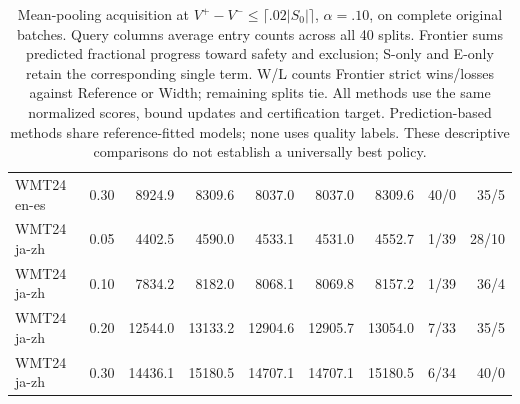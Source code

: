 \begin{table}[t]
\begin{tabular}{lrrrrrrrr}
WMT24 en-es & 0.30 & 8924.9 & 8309.6 & 8037.0 & 8037.0 & 8309.6 & 40/0 & 35/5 \\
WMT24 ja-zh & 0.05 & 4402.5 & 4590.0 & 4533.1 & 4531.0 & 4552.7 & 1/39 & 28/10 \\
WMT24 ja-zh & 0.10 & 7834.2 & 8182.0 & 8068.1 & 8069.8 & 8157.2 & 1/39 & 36/4 \\
WMT24 ja-zh & 0.20 & 12544.0 & 13133.2 & 12904.6 & 12905.7 & 13054.0 & 7/33 & 35/5 \\
WMT24 ja-zh & 0.30 & 14436.1 & 15180.5 & 14707.1 & 14707.1 & 15180.5 & 6/34 & 40/0 \\
\bottomrule
\end{tabular}
\caption{Mean-pooling acquisition at $V^+-V^-\le\lceil .02|S_0|\rceil$, $\alpha=.10$, on complete original batches. Query columns average entry counts across all 40 splits. Frontier sums predicted fractional progress toward safety and exclusion; S-only and E-only retain the corresponding single term. W/L counts Frontier strict wins/losses against Reference or Width; remaining splits tie. All methods use the same normalized scores, bound updates and certification target. Prediction-based methods share reference-fitted models; none uses quality labels. These descriptive comparisons do not establish a universally best policy.}
\label{tab:frontier-primary}
\end{table}
